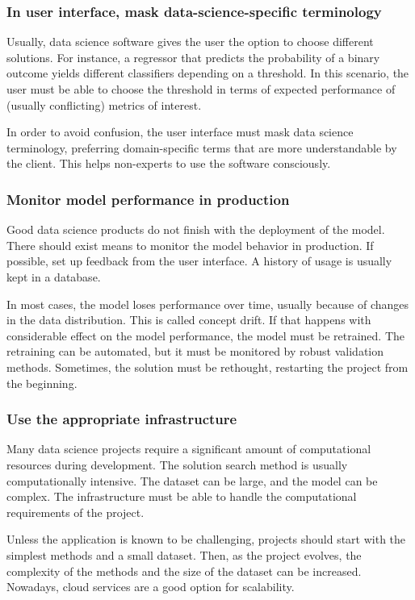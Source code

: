 \subsubsection{In user interface, mask data-science-specific terminology}

Usually, data science software gives the user the option to choose different solutions.
For instance, a regressor that predicts the probability of a binary outcome yields
different classifiers depending on a threshold.  In this scenario, the user must be able
to choose the threshold in terms of expected performance of (usually conflicting) metrics
of interest.

In order to avoid confusion, the user interface must mask data science
terminology, preferring domain-specific terms that are more understandable by the client.
This helps non-experts to use the software consciously.

\subsubsection{Monitor model performance in production}

Good data science products do not finish with the deployment of the model.  There should
exist means to monitor the model behavior in production.  If possible, set up feedback from
the user interface.  A history of usage is usually kept in a database.

In most cases, the model loses performance over time, usually because of changes in
the data distribution.  This is called concept drift.
If that happens with considerable effect on the model performance, the model must be
retrained.  The retraining can be automated, but it must be monitored by robust validation
methods. Sometimes, the solution must be rethought, restarting the project from the
beginning.

\subsubsection{Use the appropriate infrastructure}

Many data science projects require a significant amount of computational resources during development.
The solution search method is usually computationally intensive.  The dataset can be
large, and the model can be complex.  The infrastructure must be able to handle the
computational requirements of the project.

Unless the application is known to be challenging, projects should start with the simplest methods
and a small dataset.  Then, as the project evolves, the complexity of the methods and the
size of the dataset can be increased.  Nowadays, cloud services are a good option for
scalability.

